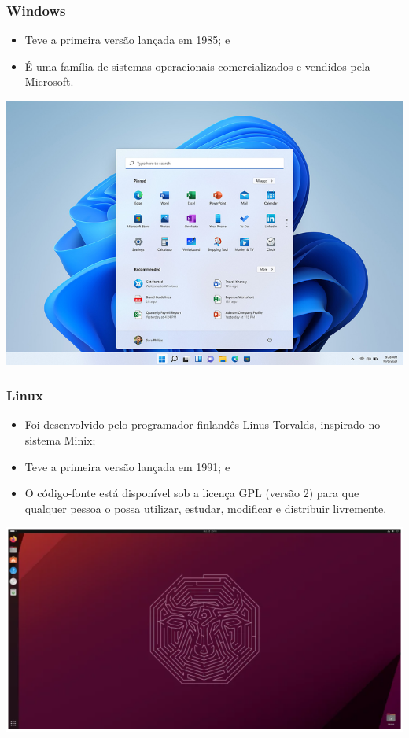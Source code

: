 \documentclass[aspectratio=169]{beamer} %
\begin{document}
\begin{frame}
	\frametitle{Windows}
	
	\begin{itemize}
		\item Teve a primeira versão lançada em 1985; e
		\item É uma família de sistemas operacionais comercializados e vendidos pela Microsoft.
	\end{itemize}\vfill
	
	\begin{center}
		\includegraphics[scale=1]{img/windows11}
	\end{center}
\end{frame}

\begin{frame}
	\frametitle{Linux}
	
	\begin{itemize}
		\item Foi desenvolvido pelo programador finlandês Linus Torvalds, inspirado no sistema Minix; 
		\item Teve a primeira versão lançada em 1991; e
		\item O código-fonte está disponível sob a licença GPL (versão 2) para que qualquer pessoa o possa utilizar, estudar, modificar e distribuir livremente.
	\end{itemize}\vfill
	
	\begin{center}
		\includegraphics[scale=0.4]{img/ubuntu2310}
	\end{center}
\end{frame}
\end{document}
